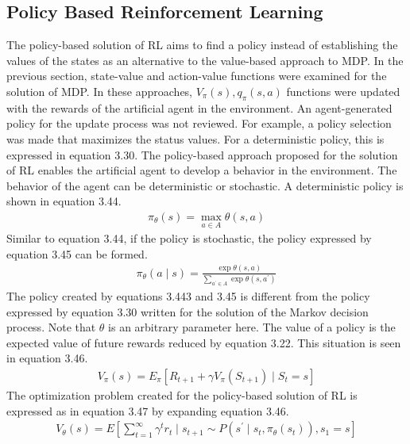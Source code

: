 \documentclass[12pt,twoside,a4]{mwbk}
\begin{document}
\subsection{Policy Based Reinforcement Learning}
The policy-based solution of RL aims to find a policy instead of establishing the values of the states as an alternative to the value-based approach to MDP. In the previous section, state-value and action-value functions were examined for the solution of MDP. In these approaches, $V_{\pi}(s), q_{\pi}(s, a)$ functions were updated with the rewards of the artificial agent in the environment. An agent-generated policy for the update process was not reviewed. For example, a policy selection was made that maximizes the status values. For a deterministic policy, this is expressed in equation 3.30. The policy-based approach proposed for the solution of RL enables the artificial agent to develop a behavior in the environment. The behavior of the agent can be deterministic or stochastic. A deterministic policy is shown in equation 3.44.
\begin{subequations}
\begin{align}
   \pi_{\theta}(s)=\max _{a \in A} \theta(s, a)
\end{align}
\end{subequations}
Similar to equation 3.44, if the policy is stochastic, the policy expressed by equation 3.45 can be formed.
\begin{subequations}
\begin{align}
   \pi_{\theta}(a \mid s)=\frac{\exp \theta(s, a)}{\sum_{a^{\prime} \in A} \exp \theta\left(s, a^{\prime}\right)}
\end{align}
\end{subequations}
The policy created by equations 3.443 and 3.45 is different from the policy expressed by equation 3.30 written for the solution of the Markov decision process. Note that $\theta$ is an arbitrary parameter here. The value of a policy is the expected value of future rewards reduced by equation 3.22. This situation is seen in equation 3.46.
\begin{subequations}
\begin{align}
   V_{\pi}(s)=E_{\pi}\left[R_{t+1}+\gamma V_{\pi}\left(S_{t+1}\right) \mid S_{t}=s\right]
\end{align}
\end{subequations}
The optimization problem created for the policy-based solution of RL is expressed as in equation 3.47 by expanding equation 3.46.
\begin{subequations}
\begin{align}
   V_{\theta}(s)=E\left[\sum_{t=1}^{\infty} \gamma^{t} r_{t} \mid s_{t+1} \sim P\left(s^{\prime} \mid s_{t}, \pi_{\theta}\left(s_{t}\right)\right), s_{1}=s\right]
\end{align}
\end{subequations}
\end{document}
